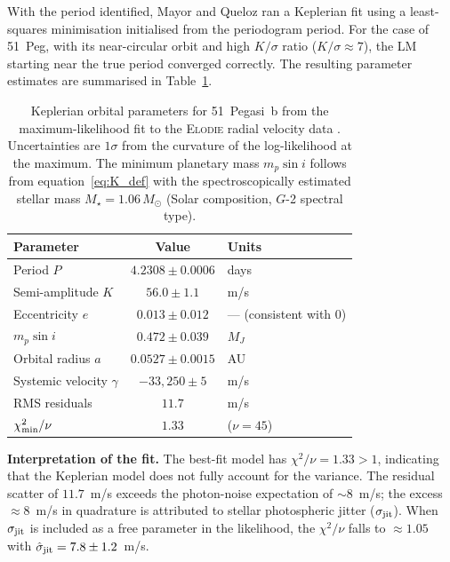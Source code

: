\documentclass[12pt]{article}
\begin{document}
With the period identified, Mayor and Queloz ran a Keplerian fit using
a least-squares minimisation initialised from the periodogram period.
For the case of 51~Peg, with its near-circular orbit and high $K/\sigma$
ratio ($K/\sigma \approx 7$), the LM starting near the true period
converged correctly.  The resulting parameter estimates are summarised
in Table~\ref{tab:51peg_params}.

\begin{table}[ht]
\centering
\caption{Keplerian orbital parameters for 51~Pegasi~b from the
maximum-likelihood fit to the \textsc{Elodie} radial velocity data
\citep{Mayor1995}.  Uncertainties are $1\sigma$ from the curvature of
the log-likelihood at the maximum.  The minimum planetary mass
$m_p\sin i$ follows from equation~\eqref{eq:K_def} with the spectroscopically
estimated stellar mass $M_\star = 1.06\,M_\odot$
(Solar composition, $G$-2 spectral type).}
\label{tab:51peg_params}
\medskip
\begin{tabular}{p{4.5cm}cl}
\toprule
Parameter & Value & Units \\
\midrule
Period $P$              & $4.2308 \pm 0.0006$ & days \\
Semi-amplitude $K$      & $56.0 \pm 1.1$      & m/s \\
Eccentricity $e$        & $0.013 \pm 0.012$   & --- (consistent with 0) \\
$m_p\sin i$             & $0.472 \pm 0.039$   & $M_J$ \\
Orbital radius $a$      & $0.0527 \pm 0.0015$ & AU \\
Systemic velocity $\gamma$ & $-33{,}250 \pm 5$ & m/s \\
RMS residuals           & $11.7$              & m/s \\
\midrule
$\chi^2_{\rm min}/\nu$  & $1.33$              & ($\nu = 45$) \\
\bottomrule
\end{tabular}
\end{table}

\noindent\textbf{Interpretation of the fit.}  The best-fit model has
$\chi^2/\nu = 1.33 > 1$, indicating that the Keplerian model does not
fully account for the variance.  The residual scatter of $11.7$~m/s
exceeds the photon-noise expectation of $\sim 8$~m/s; the excess
$\approx 8$~m/s in quadrature is attributed to stellar photospheric
jitter ($\sigma_{\rm jit}$).  When $\sigma_{\rm jit}$ is included as a
free parameter in the likelihood, the $\chi^2/\nu$ falls to
$\approx 1.05$ with $\hat\sigma_{\rm jit} = 7.8 \pm 1.2$~m/s.
\end{document}
